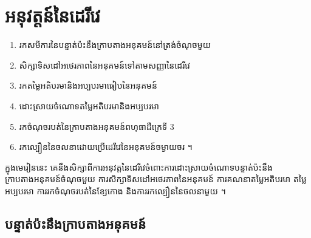 \chapter{អនុវត្តន៍នៃដេរីវេ}

\begin{objBox}[វត្ថុបំណង]
\begin{enumerate}[1]
  \item រកសមីការនៃបន្ទាត់ប៉ះនឹងក្រាបតាងអនុគមន៍នៅត្រង់ចំណុចមួយ
  \item សិក្សាទិសដៅអថេរភាពនៃអនុគមន៍ទៅតាមសញ្ញានៃដេរីវេ
  \item រកតម្លៃអតិបរមានិងអប្បបរមាធៀបនៃអនុគមន៍
  \item ដោះស្រាយចំណោទតម្លៃអតិបរមានិងអប្បបរមា
  \item រកចំណុចរបត់នៃក្រាបតាងអនុគមន៍ពហុធាដឺក្រេទី $3$
  \item រកល្បឿននៃចលនាដោយប្រើដេរីវេនៃអនុគមន៍ចម្ងាយចរ ។
\end{enumerate}
\end{objBox}

ក្នុងមេរៀននេះ គេនឹងសិក្សាពីការអនុវត្តនៃដេរីវេចំពោះការដោះស្រាយចំណោទបន្ទាត់ប៉ះនឹងក្រាបតាងអនុគមន៍ចំណុចមួយ ការសិក្សាទិសដៅអថេរភាពនៃអនុគមន៍ ការគណនាតម្លៃអតិបរមា តម្លៃអប្បបរមា ការរកចំណុចរបត់នៃខ្សែកោង និងការរកល្បឿននៃចលនាមួយ ។

\section{បន្ទាត់ប៉ះនឹងក្រាបតាងអនុគមន៍}

\begin{center}
\end{center}

